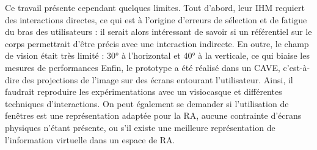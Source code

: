 Ce travail présente cependant quelques limites. Tout d'abord, leur IHM requiert des interactions directes, ce qui est à l'origine d'erreurs de sélection et de fatigue du bras des utilisateurs : il serait alors intéressant de savoir si un référentiel sur le corps permettrait d'être précis avec une interaction indirecte. En outre, le champ de vision était très limité : 30° à l'horizontal et 40° à la verticale, ce qui biaise les mesures de performances Enfin, le prototype a été réalisé dans un CAVE, c'est-à-dire des projections de l'image sur des écrans entourant l'utilisateur. Ainsi, il faudrait reproduire les expérimentations avec un visiocasque et différentes techniques d'interactions. On peut également se demander si l'utilisation de fenêtres est une représentation adaptée pour la RA, aucune contrainte d'écrans physiques n'étant présente, ou s'il existe une meilleure représentation de l'information virtuelle dans un espace de RA.


